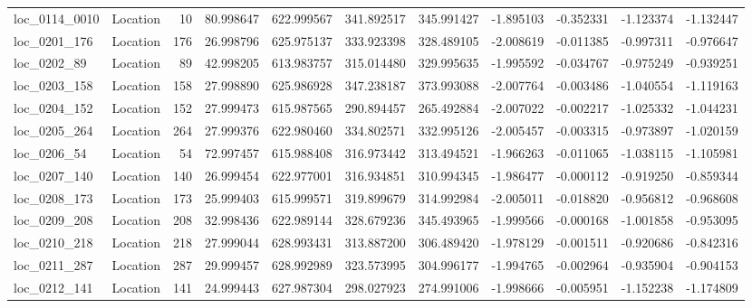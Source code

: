 \begin{tabular}{llrrrrrrrrr}
loc_0114_0010 &        Location &              10 &  80.998647 & 622.999567 &  341.892517 &    345.991427 &  -1.895103 &  -0.352331 &   -1.123374 &     -1.132447 \\
 loc_0201_176 &        Location &             176 &  26.998796 & 625.975137 &  333.923398 &    328.489105 &  -2.008619 &  -0.011385 &   -0.997311 &     -0.976647 \\
  loc_0202_89 &        Location &              89 &  42.998205 & 613.983757 &  315.014480 &    329.995635 &  -1.995592 &  -0.034767 &   -0.975249 &     -0.939251 \\
 loc_0203_158 &        Location &             158 &  27.998890 & 625.986928 &  347.238187 &    373.993088 &  -2.007764 &  -0.003486 &   -1.040554 &     -1.119163 \\
 loc_0204_152 &        Location &             152 &  27.999473 & 615.987565 &  290.894457 &    265.492884 &  -2.007022 &  -0.002217 &   -1.025332 &     -1.044231 \\
 loc_0205_264 &        Location &             264 &  27.999376 & 622.980460 &  334.802571 &    332.995126 &  -2.005457 &  -0.003315 &   -0.973897 &     -1.020159 \\
  loc_0206_54 &        Location &              54 &  72.997457 & 615.988408 &  316.973442 &    313.494521 &  -1.966263 &  -0.011065 &   -1.038115 &     -1.105981 \\
 loc_0207_140 &        Location &             140 &  26.999454 & 622.977001 &  316.934851 &    310.994345 &  -1.986477 &  -0.000112 &   -0.919250 &     -0.859344 \\
 loc_0208_173 &        Location &             173 &  25.999403 & 615.999571 &  319.899679 &    314.992984 &  -2.005011 &  -0.018820 &   -0.956812 &     -0.968608 \\
 loc_0209_208 &        Location &             208 &  32.998436 & 622.989144 &  328.679236 &    345.493965 &  -1.999566 &  -0.000168 &   -1.001858 &     -0.953095 \\
 loc_0210_218 &        Location &             218 &  27.999044 & 628.993431 &  313.887200 &    306.489420 &  -1.978129 &  -0.001511 &   -0.920686 &     -0.842316 \\
 loc_0211_287 &        Location &             287 &  29.999457 & 628.992989 &  323.573995 &    304.996177 &  -1.994765 &  -0.002964 &   -0.935904 &     -0.904153 \\
 loc_0212_141 &        Location &             141 &  24.999443 & 627.987304 &  298.027923 &    274.991006 &  -1.998666 &  -0.005951 &   -1.152238 &     -1.174809 \\

\end{tabular}
